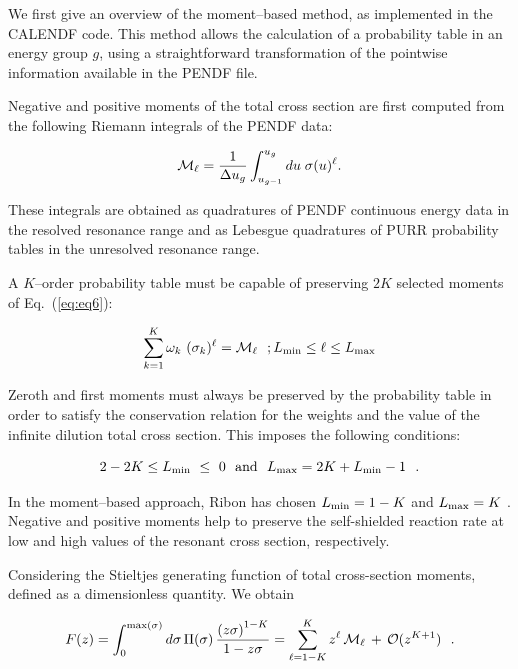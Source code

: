 We first give an overview of the moment--based method, as implemented in the
CALENDF code. This method allows the calculation of a probability table in an
energy group $g$, using a straightforward transformation of the pointwise
information available in the PENDF file.

\vskip 0.1cm

Negative and positive moments of the total cross section are first computed
from the following Riemann integrals of the PENDF data:

\begin{equation}
{\cal M}_\ell={1 \over
\Delta u_g}\int_{u_{g-1}}^{u_g} du \; \sigma(u)^\ell .
\label{eq:eq6}
\end{equation}

These integrals are obtained as quadratures of PENDF continuous energy data in
the resolved resonance range and as Lebesgue quadratures of PURR probability
tables in the unresolved resonance range.

\vskip 0.1cm

A $K$--order probability table must be capable of preserving $2K$ selected
moments of Eq.~(\ref{eq:eq6}):

\begin{equation}
\sum_{k=1}^K \omega_k \ (\sigma_k)^\ell={\cal M}_\ell \  \ ; L_{\rm min}\le
\ell \le L_{\rm max}
\label{eq:eq7}
\end{equation}

Zeroth and first moments must always be preserved by the probability table in
order to satisfy the conservation relation for the weights and the value of the
infinite dilution total cross section. This imposes the following conditions:

\begin{equation}
\nonumber 2-2K \le L_{\rm min} \ \le \ 0 \ \ {\rm and}
\ \ L_{\rm max} = 2K+L_{\rm min}-1 \ \ .
\end{equation}

\vskip 0.1cm

In the moment--based approach, Ribon has chosen $L_{\rm min}=1-K$ and
$L_{\rm max}=K$ \cite{ribon}. Negative and positive moments help to preserve the
self-shielded reaction rate at low and high values of the resonant cross
section, respectively.

\vskip 0.1cm

Considering the Stieltjes generating function of total cross-section moments,
defined as a dimensionless quantity. We obtain

\begin{equation}
F(z)=\int_{0}^{\max(\sigma)} d\sigma \, \Pi(\sigma) \,
{\left(z\sigma\right)^{1-K} \over 1-z\sigma}=\sum_{\ell=1-K}^{K} z^\ell \,
{\cal M}_\ell \, + \, {\cal O}(z^{K+1}) \ \ .
\label{eq:eq8}
\end{equation}

